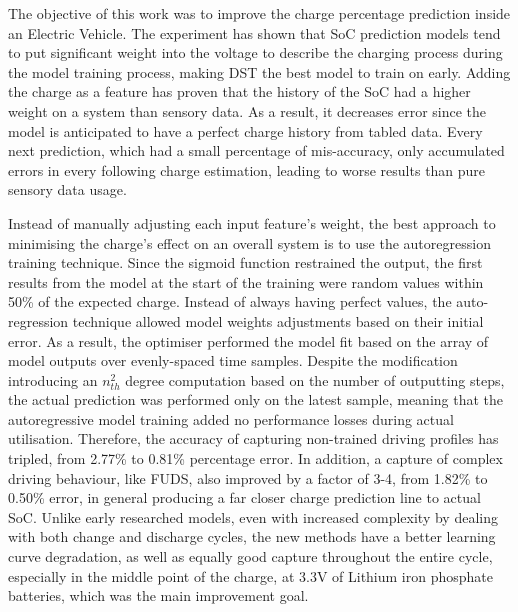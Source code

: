 {The objective of this work was to improve the charge percentage prediction inside an Electric Vehicle.}
The experiment has shown that SoC prediction models tend to put significant weight into the voltage to describe the charging process during the model training process, making DST the best model to train on early.
Adding the charge as a feature has proven that the history of the SoC had a higher weight on a system than sensory data.
As a result, it decreases error since the model is anticipated to have a perfect charge history from tabled data.
Every next prediction, which had a small percentage of mis-accuracy, only accumulated errors in every following charge estimation, leading to worse results than pure sensory data usage.

%
%
Instead of manually adjusting each input feature's weight, the best approach to minimising the charge's effect on an overall system is to use the autoregression training technique. 
Since the sigmoid function restrained the output, the first results from the model at the start of the training were random values within 50\% of the expected charge.
Instead of always having perfect values, the auto-regression technique allowed model weights adjustments based on their initial error.
As a result, the optimiser performed the model fit based on the array of model outputs over evenly-spaced time samples.
Despite the modification introducing an $n_{th}^{2}$ degree computation based on the number of outputting steps, the actual prediction was performed only on the latest sample, meaning that the autoregressive model training added no performance losses during actual utilisation.
Therefore, the accuracy of capturing non-trained driving profiles has tripled, from 2.77\% to 0.81\% percentage error.
In addition, a capture of complex driving behaviour, like FUDS, also improved by a factor of 3-4, from 1.82\% to 0.50\% error, in general producing a far closer charge prediction line to actual SoC.
Unlike early researched models, even with increased complexity by dealing with both change and discharge cycles, the new methods have a better learning curve degradation, as well as equally good capture throughout the entire cycle, especially in the middle point of the charge, at 3.3V of Lithium iron phosphate batteries, which was the main improvement goal.

